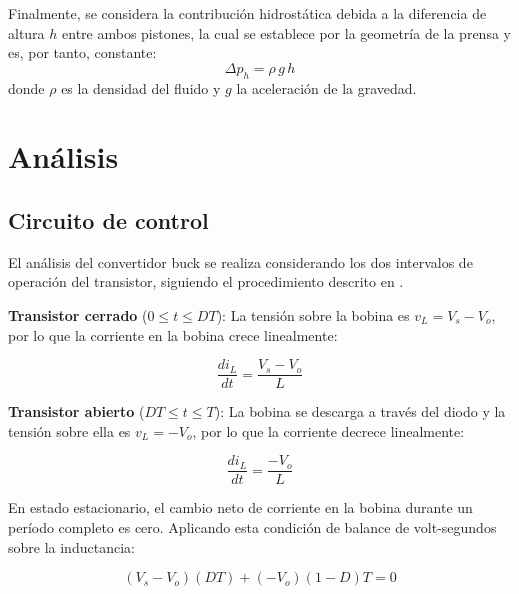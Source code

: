\documentclass[journal]{IEEEtran}
\begin{document}
\setlength{\parskip}{1em}

Finalmente, se considera la contribución hidrostática debida a la diferencia 
de altura $h$ entre ambos pistones, la cual se establece por la geometría de 
la prensa y es, por tanto, constante:
\begin{equation}
    \Delta p_{h} = \rho \, g \, h
\label{eq:presion_hidrostatica}
\end{equation}
donde $\rho$ es la densidad del fluido y $g$ la aceleración de la gravedad.

\section{Análisis}

\subsection{Circuito de control}

El análisis del convertidor buck se realiza considerando los dos 
intervalos de operación del transistor, siguiendo el procedimiento 
descrito en \cite{hart2011}.

\textbf{Transistor cerrado} ($0 \leq t \leq DT$): La tensión sobre 
la bobina es $v_L = V_s - V_o$, por lo que la corriente en la bobina 
crece linealmente:

\begin{equation}
    \frac{di_L}{dt} = \frac{V_s - V_o}{L}
    \label{eq:buck_on}
\end{equation}

\textbf{Transistor abierto} ($DT \leq t \leq T$): La bobina se 
descarga a través del diodo y la tensión sobre ella es $v_L = -V_o$, 
por lo que la corriente decrece linealmente:

\begin{equation}
    \frac{di_L}{dt} = \frac{-V_o}{L}
    \label{eq:buck_off}
\end{equation}

En estado estacionario, el cambio neto de corriente en la bobina 
durante un período completo es cero. Aplicando esta condición de 
balance de volt-segundos sobre la inductancia:

\begin{equation}
    (V_s - V_o)(DT) + (-V_o)(1-D)T = 0
\end{equation}
\end{document}
